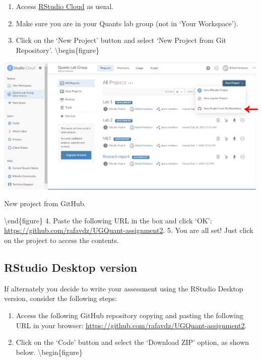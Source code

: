 \documentclass[
]{book}
\providecommand{\tightlist}{%
  \setlength{\itemsep}{0pt}\setlength{\parskip}{0pt}}
\begin{document}
\begin{enumerate}
\def\labelenumi{\arabic{enumi}.}
\tightlist
\item
  Access \href{https://rstudio.cloud/}{RStudio Cloud} as usual.
\item
  Make sure you are in your Quants lab group (not in `Your Workspace').
\item
  Click on the `New Project' button and select `New Project from Git Repository'.
  \textbackslash begin\{figure\}
\end{enumerate}

\includegraphics[width=1\linewidth]{./images/research_rep_2} \hfill{}

\caption{New project from GitHub.}

\label{fig:unnamed-chunk-114}
\textbackslash end\{figure\}
4. Paste the following URL in the box and click `OK': \url{https://github.com/rafavdz/UGQuant-assignment2}.
5. You are all set! Just click on the project to access the contents.

\hypertarget{rstudio-desktop-version}{%
\subsection{RStudio Desktop version}\label{rstudio-desktop-version}}

If alternately you decide to write your assessment using the RStudio Desktop version, consider the following steps:

\begin{enumerate}
\def\labelenumi{\arabic{enumi}.}
\tightlist
\item
  Access the following GitHub repository copying and pasting the following URL in your browser: \url{https://github.com/rafavdz/UGQuant-assignment2}.
\item
  Click on the `Code' button and select the `Download ZIP' option, as shown below.
  \textbackslash begin\{figure\}
\end{enumerate}
\end{document}
